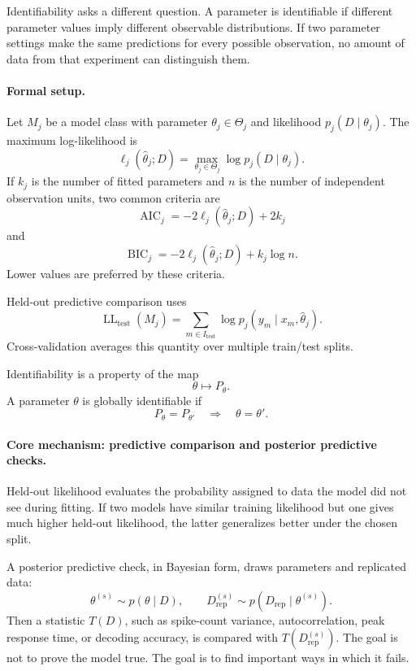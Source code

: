 Identifiability asks a different question. A parameter is identifiable if different parameter values imply different observable distributions. If two parameter settings make the same predictions for every possible observation, no amount of data from that experiment can distinguish them.

\paragraph{Formal setup.}
Let \(M_j\) be a model class with parameter \(\theta_j\in\Theta_j\) and likelihood \(p_j(D\mid\theta_j)\). The maximum log-likelihood is
\[
\ell_j(\widehat\theta_j;D)=\max_{\theta_j\in\Theta_j}\log p_j(D\mid\theta_j).
\]
If \(k_j\) is the number of fitted parameters and \(n\) is the number of independent observation units, two common criteria are
\[
\boxed{\operatorname{AIC}_j=-2\ell_j(\widehat\theta_j;D)+2k_j}
\]
and
\[
\boxed{\operatorname{BIC}_j=-2\ell_j(\widehat\theta_j;D)+k_j\log n.}
\]
Lower values are preferred by these criteria.

Held-out predictive comparison uses
\[
\operatorname{LL}_{\mathrm{test}}(M_j)
=\sum_{m\in I_{\mathrm{test}}}\log p_j(y_m\mid x_m,\widehat\theta_j).
\]
Cross-validation averages this quantity over multiple train/test splits.

Identifiability is a property of the map
\[
\theta\mapsto P_\theta.
\]
A parameter \(\theta\) is globally identifiable if
\[
P_\theta=P_{\theta'}\quad\Longrightarrow\quad \theta=\theta'.
\]

\paragraph{Core mechanism: predictive comparison and posterior predictive checks.}
Held-out likelihood evaluates the probability assigned to data the model did not see during fitting. If two models have similar training likelihood but one gives much higher held-out likelihood, the latter generalizes better under the chosen split.

A posterior predictive check, in Bayesian form, draws parameters and replicated data:
\[
\theta^{(s)}\sim p(\theta\mid D),\qquad
D_{\mathrm{rep}}^{(s)}\sim p(D_{\mathrm{rep}}\mid \theta^{(s)}).
\]
Then a statistic \(T(D)\), such as spike-count variance, autocorrelation, peak response time, or decoding accuracy, is compared with \(T(D_{\mathrm{rep}}^{(s)})\). The goal is not to prove the model true. The goal is to find important ways in which it fails.

